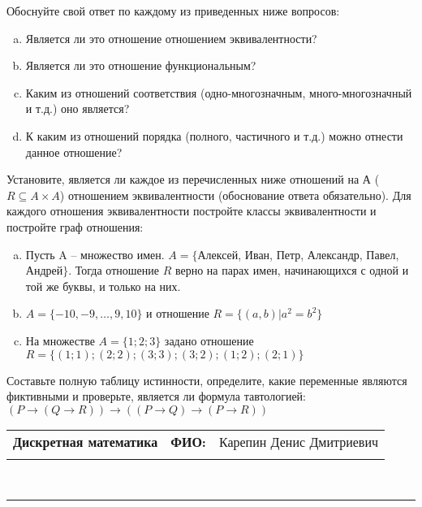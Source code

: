 \documentclass[10pt]{exam}
\newcommand{\class}{Дискретная математика}
\newcommand{\examdate}{}
\begin{document}
\begin{questions}
Обоснуйте свой ответ по каждому из приведенных ниже вопросов:
\begin{enumerate} [a)]\setcounter{enumi}{0}
    \item Является ли это отношение отношением эквивалентности?
    \item Является ли это отношение функциональным?
    \item Каким из отношений соответствия (одно-многозначным, много-многозначный и т.д.) оно является?
    \item К каким из отношений порядка (полного, частичного и т.д.) можно отнести данное отношение?
\end{enumerate}
\question
Установите, является ли каждое из перечисленных ниже отношений на А ($R \subseteq A \times A$) отношением эквивалентности (обоснование ответа обязательно). Для каждого отношения эквивалентности постройте классы 
эквивалентности и постройте граф отношения:
\begin{enumerate} [a)]\setcounter{enumi}{0}
\item Пусть A – множество имен. $A = \{ $Алексей, Иван, Петр, Александр, Павел, Андрей$ \}$. Тогда отношение $R$ верно на парах имен, начинающихся с одной и той же буквы, и только на них.
\item $A = \{-10, -9, … , 9, 10\}$ и отношение $ R = \{(a,b)|a^{2} = b^{2}\}$
\item На множестве $A = \{1; 2; 3\}$ задано отношение $R = \{(1; 1); (2; 2); (3; 3); (3; 2); (1; 2); (2; 1)\}$
\end{enumerate}\question Составьте полную таблицу истинности, определите, какие переменные являются фиктивными и проверьте, является ли формула тавтологией:
$(P \rightarrow (Q \rightarrow R)) \rightarrow ((P \rightarrow Q) \rightarrow (P \rightarrow R))$

\end{questions}
\newpage
\begin{flushright}
\begin{tabular}{p{2.8in} r l}
\textbf{\class} & \textbf{ФИО:} &Карепин Денис Дмитриевич
\\

\textbf{\examdate} &&\\
\end{tabular}\\
\end{flushright}
\rule[1ex]{\textwidth}{.1pt}
\end{document}
